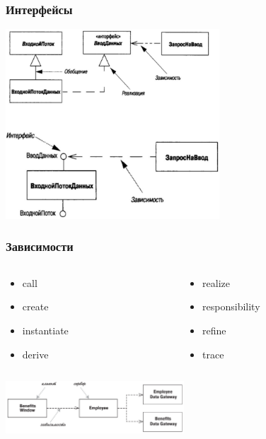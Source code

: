 \documentclass{../mcsslides}
\begin{document}
    \begin{frame}
        \frametitle{Интерфейсы}
        \begin{center}
            \includegraphics[width=0.6\textwidth]{interfaces.png}
        \end{center}
    \end{frame}

    \begin{frame}
        \frametitle{Зависимости}
        \begin{columns}
            \begin{column}{0.5\textwidth}
                \begin{itemize}
                    \item call
                    \item create
                    \item instantiate
                    \item derive 
                \end{itemize}
            \end{column}
            \begin{column}{0.5\textwidth}
                \begin{itemize}
                    \item realize
                    \item responsibility
                    \item refine 
                    \item trace
                \end{itemize}
            \end{column}
        \end{columns}
        \vspace{7mm}
        \begin{center}
            \includegraphics[width=0.5\textwidth]{dependencies.png}
        \end{center}
    \end{frame}
\end{document}
